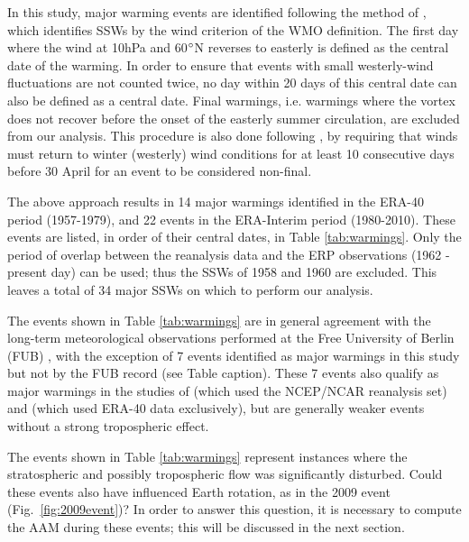 \documentclass[draft,jgrga]{agutex}
\begin{document}
\begin{article}
In this study, major warming events are identified following the method of \citet{Charlton2007}, which identifies SSWs by the wind criterion of the WMO definition.
The first day where the wind at 10hPa and 60$^\circ$N reverses to easterly  is defined as the central date of the warming.
In order to ensure that events with small westerly-wind fluctuations are not counted twice, no day within 20 days of this central date can also be defined as a central date.
Final warmings, i.e. warmings where the vortex does not recover before the
onset of the easterly summer circulation, are excluded from our analysis.
This procedure is also done following \citet{Charlton2007},  by requiring that winds must return to winter (westerly) wind conditions for at least 10 consecutive days before 30 April for an event to be considered non-final.


The above approach results in 14 major warmings identified in the ERA-40 period (1957-1979), and 22 events in the ERA-Interim period (1980-2010).
These events are listed, in order of their central dates, in Table \ref{tab:warmings}.
Only the period of overlap between the reanalysis data and the ERP observations (1962 - present day) can be used; thus the SSWs of 1958 and 1960 are excluded.
This leaves a total of 34 major SSWs on which to perform our analysis.


The events shown in Table  \ref{tab:warmings} are in general agreement with the long-term meteorological observations performed at the Free University of Berlin (FUB) \citep[and online at \url{http://www.geo.fu-berlin.de/met/ag/strat/produkte/northpole/index.html}]{labitzkenaujokat2000}, with the exception of 7 events identified as major warmings in this study but not by the FUB record (see Table caption).
These 7 events also qualify as major warmings in the studies of \citet{Charlton2007} (which used the NCEP/NCAR reanalysis set) and \citet{bancalaetal2012} (which used ERA-40 data exclusively), but  are generally weaker events without a strong tropospheric effect.

The events shown in Table \ref{tab:warmings} represent instances where the stratospheric and possibly tropospheric flow was significantly disturbed.
Could these events also have influenced Earth rotation, as in the 2009 event (Fig.~\ref{fig:2009event})?
In order to answer this question, it is necessary to compute the AAM  during these events; this will be discussed in the next section.




\end{article}
\end{document}
